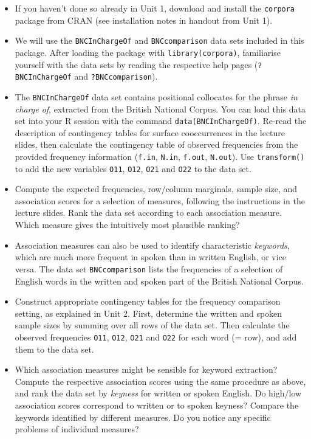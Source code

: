\documentclass[a4paper,12pt]{article}
\begin{document}
\begin{itemize}
\item If you haven't done so already in Unit 1, download and install the
  \texttt{corpora} package from CRAN (see installation notes in handout from
  Unit 1).
\item We will use the \texttt{BNCInChargeOf} and \texttt{BNCcomparison} data
  sets included in this package. After loading the package with
  \texttt{library(corpora)}, familiarise yourself with the data sets by
  reading the respective help pages (\texttt{?BNCInChargeOf} and
  \texttt{?BNCcomparison}).
\item The \texttt{BNCInChargeOf} data set contains positional collocates for
  the phrase \emph{in charge of}, extracted from the British National Corpus.
  You can load this data set into your R session with the command
  \texttt{data(BNCInChargeOf)}.  Re-read the description of contingency tables
  for surface cooccurrences in the lecture slides, then calculate the
  contingency table of observed frequencies from the provided frequency
  information (\texttt{f.in}, \texttt{N.in}, \texttt{f.out}, \texttt{N.out}).
  Use \texttt{transform()} to add the new variables \texttt{O11},
  \texttt{O12}, \texttt{O21} and \texttt{O22} to the data set.
\item Compute the expected frequencies, row/column marginals, sample size, and
  association scores for a selection of measures, following the instructions
  in the lecture slides.  Rank the data set according to each association
  measure.  Which measure gives the intuitively most plausible ranking?
\item Association measures can also be used to identify characteristic
  \emph{keywords}, which are much more frequent in spoken than in written
  English, or vice versa.  The data set \texttt{BNCcomparison} lists the
  frequencies of a selection of English words in the written and spoken part
  of the British National Corpus.
\item Construct appropriate contingency tables for the frequency comparison
  setting, as explained in Unit 2.  First, determine the written and spoken
  sample sizes by summing over all rows of the data set.  Then calculate the
  observed frequencies \texttt{O11}, \texttt{O12}, \texttt{O21} and
  \texttt{O22} for each word (= row), and add them to the data set.
\item Which association measures might be sensible for keyword extraction?
  Compute the respective association scores using the same procedure as above,
  and rank the data set by \emph{keyness} for written or spoken English.  Do
  high/low association scores correspond to written or to spoken keyness?
  Compare the keywords identified by different measures.  Do you notice any
  specific problems of individual measures?
\end{itemize}
\end{document}
